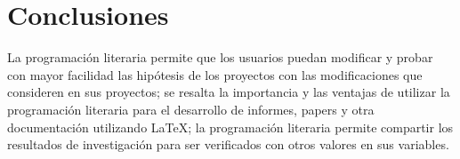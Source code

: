 \documentclass[conference]{IEEEtran}
\begin{document}
\section{Conclusiones}
La programación literaria permite que los usuarios puedan modificar y probar con mayor facilidad las hipótesis de los proyectos con las modificaciones que consideren en sus proyectos;
se resalta la importancia y las ventajas de utilizar la programación literaria para el desarrollo de informes, papers y otra documentación utilizando LaTeX;
la programación literaria permite compartir los resultados de investigación para ser verificados con otros valores en sus variables.
\end{document}
